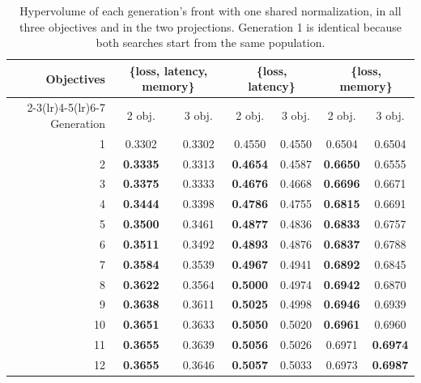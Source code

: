 \documentclass[11pt]{article}
\begin{document}
\begin{table}[htbp]
\centering
\small
\begin{tabular}{rcccccc}
\toprule
Objectives & \multicolumn{2}{c}{\{loss, latency, memory\}} & \multicolumn{2}{c}{\{loss, latency\}} & \multicolumn{2}{c}{\{loss, memory\}} \\
\cmidrule(lr){2-3}\cmidrule(lr){4-5}\cmidrule(lr){6-7}
Generation & 2 obj. & 3 obj. & 2 obj. & 3 obj. & 2 obj. & 3 obj. \\
\midrule
1  & 0.3302          & 0.3302 & 0.4550          & 0.4550 & 0.6504          & 0.6504 \\
2  & \textbf{0.3335} & 0.3313 & \textbf{0.4654} & 0.4587 & \textbf{0.6650} & 0.6555 \\
3  & \textbf{0.3375} & 0.3333 & \textbf{0.4676} & 0.4668 & \textbf{0.6696} & 0.6671 \\
4  & \textbf{0.3444} & 0.3398 & \textbf{0.4786} & 0.4755 & \textbf{0.6815} & 0.6691 \\
5  & \textbf{0.3500} & 0.3461 & \textbf{0.4877} & 0.4836 & \textbf{0.6833} & 0.6757 \\
6  & \textbf{0.3511} & 0.3492 & \textbf{0.4893} & 0.4876 & \textbf{0.6837} & 0.6788 \\
7  & \textbf{0.3584} & 0.3539 & \textbf{0.4967} & 0.4941 & \textbf{0.6892} & 0.6845 \\
8  & \textbf{0.3622} & 0.3564 & \textbf{0.5000} & 0.4974 & \textbf{0.6942} & 0.6870 \\
9  & \textbf{0.3638} & 0.3611 & \textbf{0.5025} & 0.4998 & \textbf{0.6946} & 0.6939 \\
10 & \textbf{0.3651} & 0.3633 & \textbf{0.5050} & 0.5020 & \textbf{0.6961} & 0.6960 \\
11 & \textbf{0.3655} & 0.3639 & \textbf{0.5056} & 0.5026 & 0.6971          & \textbf{0.6974} \\
12 & \textbf{0.3655} & 0.3646 & \textbf{0.5057} & 0.5033 & 0.6973          & \textbf{0.6987} \\
\bottomrule
\end{tabular}
\caption{Hypervolume of each generation's front with one shared normalization, in all three objectives
and in the two projections. Generation 1 is identical because both searches start from the same
population.}
\label{tab:hv}
\end{table}
\end{document}
